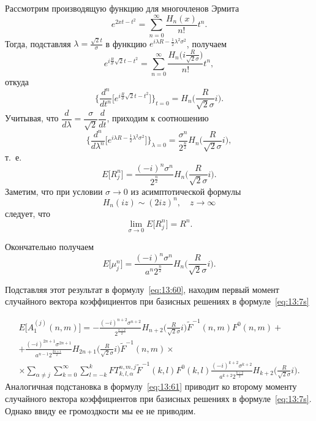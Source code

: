 Рассмотрим производящую функцию для многочленов Эрмита
$$
e^{2xt-t^2}=\sum_{n=0}^\infty\frac{H_n(x)}{n!}t^n.
$$
Тогда, подставляя $\lambda=\frac{\sqrt{2}t}{\sigma}$ в функцию $e^{i\lambda R-\frac{1}{2}\lambda^2\sigma^2}$, получаем
$$
e^{i\frac{R}{\sigma}\sqrt{2}t-t^2}=\sum_{n=0}^\infty\frac{H_n\Big(i\frac{R}{\sqrt{2}\sigma}\Big)}{n!}t^n,
$$
откуда 
$$
\bigg\{\frac{d^n}{dt^n}\bigg[e^{i\frac{R}{\sigma}\sqrt{2}t-t^2}\bigg]\bigg\}_{t=0}=H_n\bigg(\frac{R}{\sqrt{2}\sigma}i\bigg).
$$
Учитывая, что $\dfrac{d}{d\lambda}=\dfrac{\sigma}{\sqrt{2}}\dfrac{d}{dt}$, приходим к соотношению
$$
\bigg\{\frac{d^n}{d\lambda^n}\bigg[e^{i\lambda R-\frac{1}{2}\lambda^2\sigma^2}\bigg]\bigg\}_{\lambda=0}=\frac{\sigma^n}{2^\frac{n}{2}}H_n\bigg(\frac{R}{\sqrt{2}\sigma}i\bigg),
$$
т.~е.
$$
E\Big[R_j^n\Big]=\frac{(-i)^n\sigma^n}{2^\frac{n}{2}}H_n\bigg(\frac{R}{\sqrt{2}\sigma}i\bigg).
$$
Заметим, что при условии $\sigma\rightarrow 0$ из асимптотической формулы
$$
H_n(iz)\sim (2iz)^n,\quad z\rightarrow\infty
$$
следует, что
$$
\lim_{\sigma\rightarrow 0} E\Big[R_j^n\Big]=R^n.
$$

Окончательно получаем 
$$
E\Big[\mu_j^n\Big]=\frac{(-i)^n\sigma^n}{a^n 2^\frac{n}{2}}H_n\bigg(\frac{R}{\sqrt{2}\sigma}i\bigg).
$$

Подставляя этот результат в формулу~\eqref{eq:13:60}, находим первый момент случайного вектора коэффициентов при базисных решениях в формуле~\eqref{eq:13:7s}

\begin{multline}
E\bigg[A_1^{(j)}(n,m)\bigg]=-\frac{(-i)^{n+2}\sigma^{n+2}}{2^\frac{n+2}{2}}H_{n+2}\bigg(\frac{R}{\sqrt{2}\sigma}i\bigg) \tilde F^{-1}(n,m)F^0(n,m)+ \\
+\frac{(-i)^{2n+1}\sigma^{2n+1}}{a^{n-1} 2^\frac{2n+1}{2}}H_{2n+1}\bigg(\frac{R}{\sqrt{2}\sigma}i\bigg)
\tilde F^{-1}(n,m)\times \\
\times\sum_{\alpha\neq j}\sum_{k=0}^\infty\sum_{l=-k}^k FT_{k,l,\alpha}^{n,m,j}\tilde F^{-1}(k,l)F^0(k,l)
\frac{(-i)^{k+2}\sigma^{k+2}}{a^{k+2} 2^\frac{k+2}{2}}H_{k+2}\bigg(\frac{R}{\sqrt{2}\sigma}i\bigg).
\label{eq:13:62}
\end{multline}
Аналогичная подстановка в формулу~\eqref{eq:13:61} приводит ко второму моменту случайного вектора коэффициентов при базисных решениях в формуле~\eqref{eq:13:7s}. Однако ввиду ее громоздкости мы ее не приводим.

